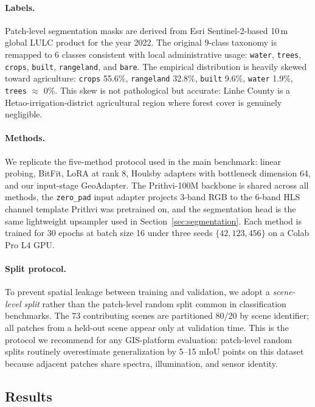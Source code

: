 \paragraph{Labels.} Patch-level segmentation masks are derived from Esri Sentinel-2-based 10\,m global LULC product for the year 2022. The original 9-class taxonomy is remapped to 6 classes consistent with local administrative usage: \texttt{water}, \texttt{trees}, \texttt{crops}, \texttt{built}, \texttt{rangeland}, and \texttt{bare}. The empirical distribution is heavily skewed toward agriculture: \texttt{crops} 55.6\%, \texttt{rangeland} 32.8\%, \texttt{built} 9.6\%, \texttt{water} 1.9\%, \texttt{trees} $\approx$ 0\%. This skew is not pathological but accurate: Linhe County is a Hetao-irrigation-district agricultural region where forest cover is genuinely negligible.

\paragraph{Methods.} We replicate the five-method protocol used in the main benchmark: linear probing, BitFit, LoRA at rank 8, Houlsby adapters with bottleneck dimension 64, and our input-stage GeoAdapter. The Prithvi-100M backbone is shared across all methods, the \texttt{zero\_pad} input adapter projects 3-band RGB to the 6-band HLS channel template Prithvi was pretrained on, and the segmentation head is the same lightweight upsampler used in Section~\ref{sec:segmentation}. Each method is trained for 30 epochs at batch size 16 under three seeds $\{42, 123, 456\}$ on a Colab Pro L4 GPU.

\paragraph{Split protocol.} To prevent spatial leakage between training and validation, we adopt a \emph{scene-level split} rather than the patch-level random split common in classification benchmarks. The 73 contributing scenes are partitioned 80/20 by scene identifier; all patches from a held-out scene appear only at validation time. This is the protocol we recommend for any GIS-platform evaluation: patch-level random splits routinely overestimate generalization by 5--15 mIoU points on this dataset because adjacent patches share spectra, illumination, and sensor identity.

\subsection{Results}

